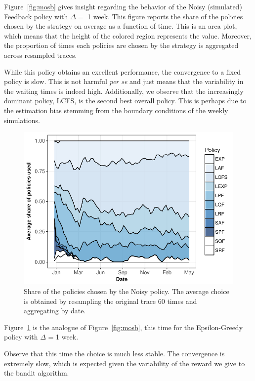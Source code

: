 \documentclass[sigconf,anonymous]{acmart}
\begin{document}
Figure~\ref{fig:mosb} gives insight regarding the behavior of the Noisy
(simulated) Feedback policy with $\Delta=$ 1 week. This figure reports the
share of the policies chosen by the strategy on average as a function of time.
This is an area plot, which means that the height of the colored region
represents the value. Moreover, the proportion of times each policies are
chosen by the strategy is aggregated across resampled traces.

While this policy obtains an excellent performance, the convergence to a fixed
policy is slow.  This is not harmful \textit{per se} and just means that the
variability in the waiting times is indeed high. Additionally, we observe that
the increasingly dominant policy, LCFS, is the second best overall policy. This
is perhaps due to the estimation bias stemming from the boundary conditions of
the weekly simulations.

\begin{figure}[]
  \centering
  \includegraphics[scale=0.6]{figures/mosaic-ANL-Intr.pdf}

  \caption{Share of the policies chosen by the Noisy policy. The average choice
  is obtained by resampling the original trace 60 times and aggregating by
  date.}

  \label{fig:mosn}
\end{figure}

Figure~\ref{fig:mosn} is the analogue of Figure~\ref{fig:mosb}, this time for
the Epsilon-Greedy policy with $\Delta$ = 1 week.

Observe that this time the choice is much less stable. The convergence is
extremely slow, which is expected given the variability of the reward we give
to the bandit algorithm.
\end{document}
